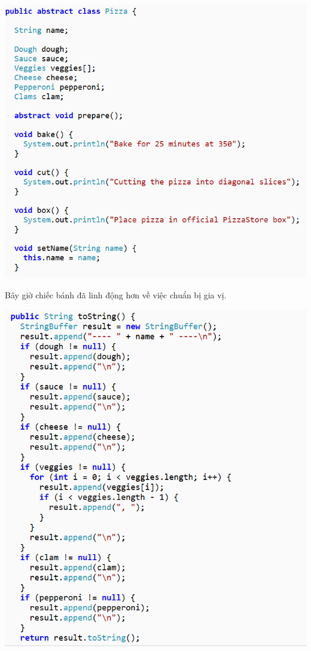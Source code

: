 \begin{center}
	\includegraphics{GALLEYS/images/chapter5/images12}
\end{center}
Bây giờ chiếc bánh đã linh động hơn về việc chuẩn bị gia vị.
\begin{center}
	\includegraphics{GALLEYS/images/chapter5/images13}
\end{center}


